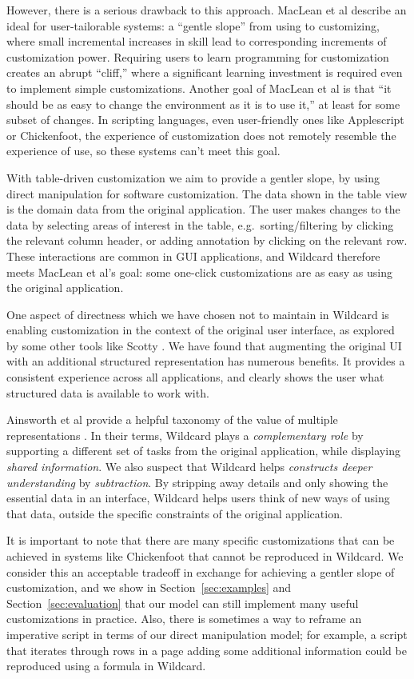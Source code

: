 \documentclass[sigplan,10pt,anonymous,review]{acmart}
\begin{document}
However, there is a serious drawback to this approach. MacLean et al
\citep{maclean1990} describe an ideal for user-tailorable systems: a
``gentle slope'' from using to customizing, where small incremental
increases in skill lead to corresponding increments of customization
power. Requiring users to learn programming for customization creates an
abrupt ``cliff,'' where a significant learning investment is required
even to implement simple customizations. Another goal of MacLean et al
is that ``it should be as easy to change the environment as it is to use
it,'' at least for some subset of changes. In scripting languages, even
user-friendly ones like Applescript or Chickenfoot, the experience of
customization does not remotely resemble the experience of use, so these
systems can't meet this goal.

With table-driven customization we aim to provide a gentler slope, by
using direct manipulation for software customization. The data shown in
the table view is the domain data from the original application. The
user makes changes to the data by selecting areas of interest in the
table, e.g.~sorting/filtering by clicking the relevant column header, or
adding annotation by clicking on the relevant row. These interactions
are common in GUI applications, and Wildcard therefore meets MacLean et
al's goal: some one-click customizations are as easy as using the
original application.

One aspect of directness which we have chosen not to maintain in
Wildcard is enabling customization in the context of the original user
interface, as explored by some other tools like Scotty
\citep{eagan2011}. We have found that augmenting the original UI with an
additional structured representation has numerous benefits. It provides
a consistent experience across all applications, and clearly shows the
user what structured data is available to work with.

Ainsworth et al provide a helpful taxonomy of the value of multiple
representations \citep{ainsworth1999}. In their terms, Wildcard plays a
\emph{complementary role} by supporting a different set of tasks from
the original application, while displaying \emph{shared information}. We
also suspect that Wildcard helps \emph{constructs deeper understanding}
by \emph{subtraction}. By stripping away details and only showing the
essential data in an interface, Wildcard helps users think of new ways
of using that data, outside the specific constraints of the original
application.

It is important to note that there are many specific customizations that
can be achieved in systems like Chickenfoot \citep{bolin2005} that
cannot be reproduced in Wildcard. We consider this an acceptable
tradeoff in exchange for achieving a gentler slope of customization, and
we show in Section~\ref{sec:examples} and Section~\ref{sec:evaluation}
that our model can still implement many useful customizations in
practice. Also, there is sometimes a way to reframe an imperative script
in terms of our direct manipulation model; for example, a script that
iterates through rows in a page adding some additional information could
be reproduced using a formula in Wildcard.
\end{document}
